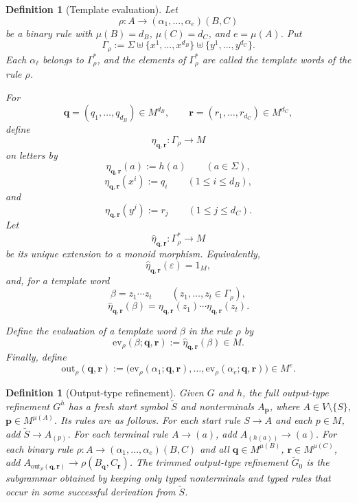 \documentclass[11pt,a4paper]{article}
\newtheorem{definition}[theorem]{Definition}
\theoremstyle{remark}
\newcommand{\out}{\mathrm{out}}
\newcommand{\ev}{\mathrm{ev}}
\newcommand{\eps}{\varepsilon}
\begin{document}
\begin{definition}[Template evaluation]
\label{def:output-map}
Let
\[
  \rho\colon A\to(\alpha_1,\ldots,\alpha_e)(B,C)
\]
be a binary rule with \(\mu(B)=d_B\), \(\mu(C)=d_C\), and
\(e=\mu(A)\).  Put
\[
  \Gamma_\rho
  :=
  \Sigma
  \uplus
  \{x^1,\ldots,x^{d_B}\}
  \uplus
  \{y^1,\ldots,y^{d_C}\}.
\]
Each \(\alpha_\ell\) belongs to \(\Gamma_\rho^*\), and the elements of
\(\Gamma_\rho^*\) are called the \emph{template words} of the rule \(\rho\).

For
\[
  \mathbf q=(q_1,\ldots,q_{d_B})\in M^{d_B},
  \qquad
  \mathbf r=(r_1,\ldots,r_{d_C})\in M^{d_C},
\]
define
\[
  \eta_{\mathbf q,\mathbf r}\colon\Gamma_\rho\to M
\]
on letters by
\[
  \eta_{\mathbf q,\mathbf r}(a):=h(a)
  \qquad (a\in\Sigma),
\]
\[
  \eta_{\mathbf q,\mathbf r}(x^i):=q_i
  \qquad (1\le i\le d_B),
\]
and
\[
  \eta_{\mathbf q,\mathbf r}(y^j):=r_j
  \qquad (1\le j\le d_C).
\]
Let
\[
  \widehat{\eta}_{\mathbf q,\mathbf r}
  \colon
  \Gamma_\rho^*\to M
\]
be its unique extension to a monoid morphism.  Equivalently,
\[
  \widehat{\eta}_{\mathbf q,\mathbf r}(\eps)=1_M,
\]
and, for a template word
\[
  \beta=z_1\cdots z_t
  \qquad (z_1,\ldots,z_t\in\Gamma_\rho),
\]
\[
  \widehat{\eta}_{\mathbf q,\mathbf r}(\beta)
  =
  \eta_{\mathbf q,\mathbf r}(z_1)
  \cdots
  \eta_{\mathbf q,\mathbf r}(z_t).
\]

Define the evaluation of a template word \(\beta\) in the rule \(\rho\) by
\[
  \ev_\rho(\beta;\mathbf q,\mathbf r)
  :=
  \widehat{\eta}_{\mathbf q,\mathbf r}(\beta)
  \in M.
\]
Finally, define
\[
  \out_\rho(\mathbf q,\mathbf r)
  :=
  \bigl(
    \ev_\rho(\alpha_1;\mathbf q,\mathbf r),
    \ldots,
    \ev_\rho(\alpha_e;\mathbf q,\mathbf r)
  \bigr)
  \in M^e.
\]
\end{definition}

\begin{definition}[Output-type refinement]
\label{def:output-refinement}
Given \(G\) and \(h\), the full output-type refinement \(G^h\) has a fresh
start symbol \(\widetilde S\) and nonterminals \(A_{\mathbf p}\), where
\(A\in V\setminus\{S\}\), \(\mathbf p\in M^{\mu(A)}\).  Its rules are as follows.
For each start rule \(S\to A\) and each \(p\in M\), add
\(\widetilde S\to A_{(p)}\).  For each terminal rule \(A\to(a)\), add
\(A_{(h(a))}\to(a)\).  For each binary rule
\(\rho\colon A\to(\alpha_1,\ldots,\alpha_e)(B,C)\) and all
\(\mathbf q\in M^{\mu(B)}\), \(\mathbf r\in M^{\mu(C)}\), add
\(A_{\out_\rho(\mathbf q,\mathbf r)}\to\rho(B_{\mathbf q},C_{\mathbf r})\).
The trimmed output-type refinement \(\widetilde G_0\) is the subgrammar
obtained by keeping only typed nonterminals and typed rules that occur in some
successful derivation from \(\widetilde S\).
\end{definition}
\end{document}
